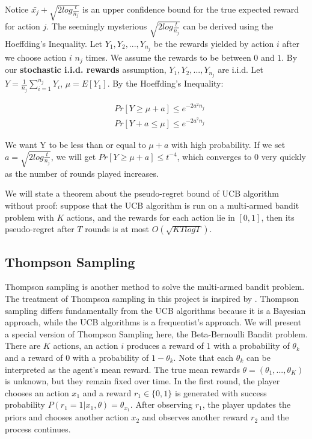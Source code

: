 \documentclass[12pt]{article}
\begin{document}
Notice $\bar{x_j} + \sqrt{2log\frac{t}{n_j}}$ is an upper confidence bound for the true expected reward for action $j$. The seemingly mysterious $\sqrt{2log\frac{t}{n_j}}$ can be derived using the Hoeffding’s Inequality. Let $Y_1,Y_2,...,Y_{n_j}$ be the rewards yielded by action $i$ after we choose action $i$ $n_j$ times. We assume the rewards to be between $0$ and $1$. By our \textbf{stochastic i.i.d. rewards} assumption,  $Y_1,Y_2,...,Y_{n_j}$ are i.i.d. Let $Y = \frac{1}{n_j}\sum_{i = 1}^{n_j}Y_i$, $\mu = E[Y_1]$. By the Hoeffding’s Inequality:

\begin{equation} 
  \begin{split}
      & Pr[Y \geq \mu + a] \leq e^{-2a^2 n_j} \\
    & Pr[Y + a \leq \mu ] \leq e^{-2a^2 n_j}
  \end{split}
\end{equation}

We want  Y to be less than or equal to $\mu + a$ with high probability. If we set $a = \sqrt{2log\frac{t}{n_j}}$, we will get $Pr[Y \geq \mu + a] \leq t^{-4}$, which converges to $0$ very quickly as the number of rounds played increases. 

We will state a theorem about the pseudo-regret bound of UCB algorithm without proof: suppose that the UCB algorithm is run on a multi-armed bandit problem with $K$ actions, and the rewards for each action lie in $[0,1]$, then its pseudo-regret after $T$ rounds is at most $O(\sqrt{KTlogT})$.

\subsection{Thompson Sampling}

Thompson sampling \cite{thompson1933} is another method to solve the multi-armed bandit problem. The treatment of Thompson sampling in this project is inspired by \cite{ThomsonTutorial}. Thompson sampling differs fundamentally from the UCB algorithms because it is a Bayesian approach, while the UCB algorithms is a frequentist's approach. We will present a special version of Thompson Sampling here, the Beta-Bernoulli Bandit problem. There are $K$ actions, an action $i$ produces a reward of $1$ with a probability of $\theta_k$ and a reward of $0$ with a probability of $1-\theta_k$. Note that each $\theta_k$ can be interpreted as the agent's mean reward. The true mean rewards $\theta = (\theta_1, ..., \theta_K)$ is unknown, but they remain fixed over time. In the first round, the player chooses an action $x_1$ and a reward $r_1 \in \{0,1\}$ is generated with success probability $P(r_1 = 1 |x_1, \theta) = \theta_{x_1}$. After observing $r_1$, the player updates the priors and chooses another action $x_2$ and observes another reward $r_2$ and the process continues. 
\end{document}
